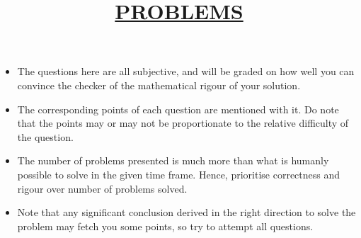 \documentclass[12pt]{article}
\theoremstyle{definition}
\begin{document}
\newpage
\maketitle
\title{\begin{center}\textbf{\underline{\fontsize{18}{12}\selectfont PROBLEMS}}\end{center}}
\begin{itemize}
    \item The questions here are all subjective, and will be graded on how well you can convince the checker of the mathematical rigour of your solution.
    \item The corresponding points of each question are mentioned with it. Do note that the points may or may not be proportionate to the relative difficulty of the question.
    \item The number of problems presented is much more than what is humanly possible to solve in the given time frame. Hence, prioritise correctness and rigour over number of problems solved.
    \item Note that any significant conclusion derived in the right direction to solve the problem may fetch you some points, so try to attempt all questions.
\end{itemize}
\bigskip
\bigskip
\bigskip
\end{document}
